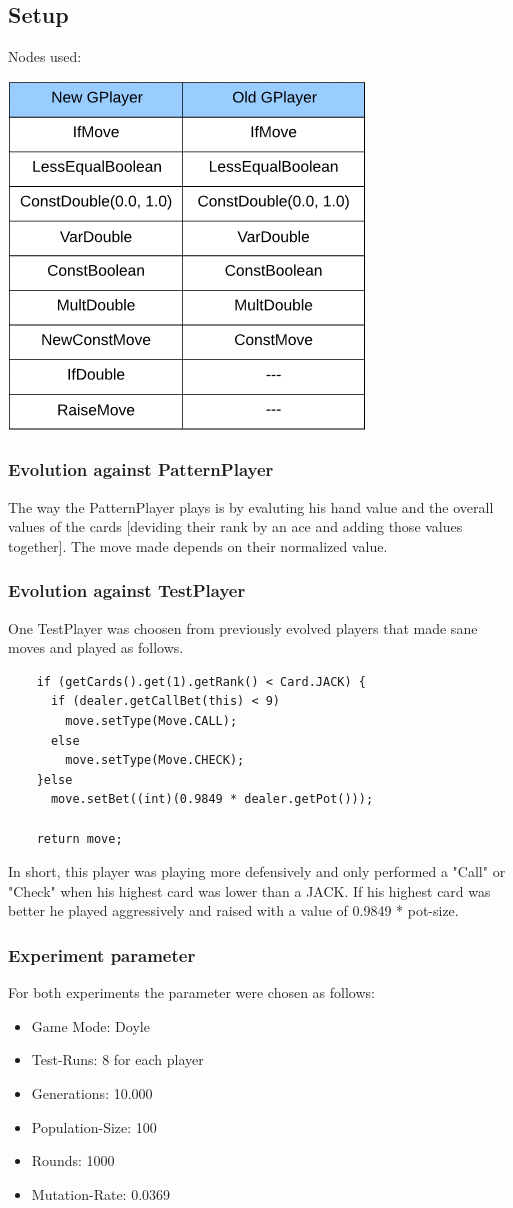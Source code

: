 \documentclass[12pt,fleqn,a4paper]{article}
\begin{document}
\subsection{Setup}
Nodes used:
\begin{flushleft}
	\includegraphics[width=.3\textwidth]{node_table.png}
\end{flushleft}	

\subsubsection{Evolution against PatternPlayer}
The way the PatternPlayer plays is by evaluting his hand value and the overall values of the cards [deviding their rank by an ace and adding those values together].
The move made depends on their normalized value.

\subsubsection{Evolution against TestPlayer}
One TestPlayer was choosen from previously evolved players that made sane moves and played as follows.
\\
\begin{lstlisting}
	if (getCards().get(1).getRank() < Card.JACK) {
	  if (dealer.getCallBet(this) < 9)
		move.setType(Move.CALL);
	  else
		move.setType(Move.CHECK);
	}else
	  move.setBet((int)(0.9849 * dealer.getPot()));
		
	return move;
\end{lstlisting}

In short, this player was playing more defensively and only performed a "Call" or "Check" when his highest card was lower than a JACK. If his highest card was better he played aggressively and raised with a value of 0.9849 * pot-size.

\newpage
\subsubsection{Experiment parameter}
For both experiments the parameter were chosen as follows: 
\begin{itemize}
	\item Game Mode:       Doyle
	\item Test-Runs:       8 for each player
	\item Generations:     10.000
	\item Population-Size: 100
	\item Rounds:          1000
	\item Mutation-Rate:   0.0369
\end{itemize} 
\end{document}

